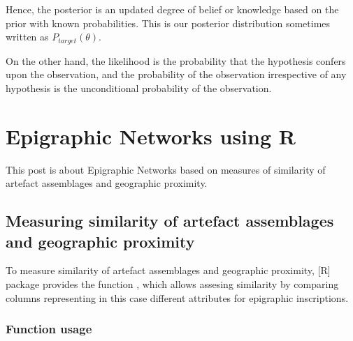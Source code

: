 \documentclass[a4paper,12pt,english]{sphinxhowto}
\begin{document}
Hence, the posterior is an updated degree of belief or knowledge based on the prior
with known probabilities. This is our posterior  distribution sometimes written
as \(P_{target}(\theta)\).

On the other hand, the likelihood is the probability that the hypothesis confers upon
the observation, and the probability of the observation irrespective of any hypothesis
is the unconditional probability of the observation.



\section{Epigraphic Networks using R}
\label{\detokenize{EpigraphicNetwork:epigraphic-networks-using-r}}\label{\detokenize{EpigraphicNetwork:edh-net}}\label{\detokenize{EpigraphicNetwork::doc}}
This post is about Epigraphic Networks based on measures of similarity of artefact assemblages and geographic proximity.



\subsection{Measuring similarity of artefact assemblages and geographic proximity}
\label{\detokenize{EpigraphicNetwork:measuring-similarity-of-artefact-assemblages-and-geographic-proximity}}
To measure similarity of artefact assemblages and geographic proximity, {[}R{]} package
 provides the function , which allows assesing similarity by comparing
columns representing \textendash{}in this case\textendash{} different attributes for epigraphic inscriptions.



\subsubsection{Function usage}
\label{\detokenize{EpigraphicNetwork:function-usage}}
\end{document}
